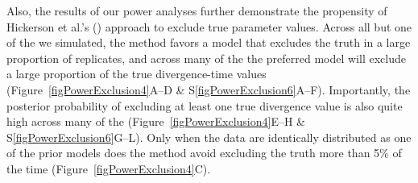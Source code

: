 
Also, the results of our power analyses further demonstrate the propensity of
Hickerson et al.'s (\citeyear{Hickerson2013}) approach to exclude true
parameter values.
Across all but one of the  we simulated, the method favors a model
that excludes the truth in a large proportion of replicates, and across many of
the  the preferred model will exclude a large proportion of the true
divergence-time values (Figure~\ref{figPowerExclusion4}A--D \&
S\ref{figPowerExclusion6}A--F).
Importantly, the posterior probability of excluding at least one true
divergence value is also quite high across many of the 
(Figure~\ref{figPowerExclusion4}E--H \& S\ref{figPowerExclusion6}G--L).
Only when the data are identically distributed as one of the prior models does
the method avoid excluding the truth more than 5\% of the time
(Figure~\ref{figPowerExclusion4}C).



